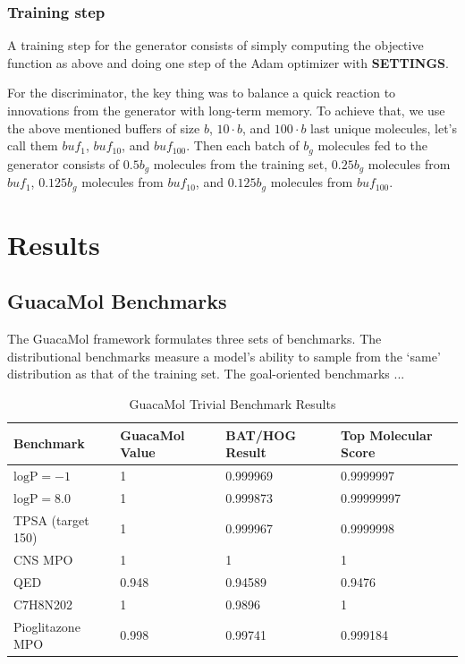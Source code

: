 \documentclass{article}
\begin{document}
\subsubsection{Training step}
A training step for the generator consists of simply computing the objective function as above and doing one step of the Adam optimizer with {\bf SETTINGS}. 

For the discriminator, the key thing was to balance a quick reaction to innovations from the generator with long-term memory. To achieve that, we use the above mentioned buffers of size $b$, $10\cdot b$, and $100\cdot b$ last unique molecules, let's call them $buf_1$, $buf_{10}$, and $buf_{100}$. Then each batch of $b_g$ molecules fed to the generator consists of $0.5 b_g$ molecules from the training set, $0.25 b_g$ molecules from $buf_1$,  $0.125 b_g$ molecules from $buf_{10}$, and  $0.125 b_g$ molecules from $buf_{100}$. 

\section{Results}\label{sec:results}
\subsection{GuacaMol Benchmarks}
The GuacaMol framework formulates three sets of benchmarks. The distributional benchmarks measure a model's ability to sample from the `same' distribution as that of the training set. The goal-oriented benchmarks ...

\begin{table}
    \caption{GuacaMol Trivial Benchmark Results}
    \label{guac-trivial}
    \centering
    \begin{tabular}{llll}
        \toprule
        Benchmark & GuacaMol Value & BAT/HOG Result & Top Molecular Score \\
        \midrule
        $\text{logP} = -1$ & 1 & 0.999969 & 0.9999997 \\
        $\text{logP} = 8.0$ & 1 & 0.999873 & 0.99999997 \\
        TPSA (target 150) & 1 & 0.999967 & 0.9999998 \\
        CNS MPO & 1 & 1 & 1 \\
        QED & 0.948 & 0.94589 & 0.9476 \\
        C7H8N202 & 1 & 0.9896 & 1 \\
        Pioglitazone MPO & 0.998 & 0.99741 & 0.999184 \\
        \bottomrule
    \end{tabular}
\end{table}
\end{document}
